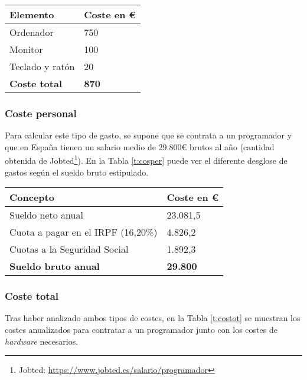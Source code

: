 \begin{center}
\begin{tabular}{|l|l|}
\hline
\textbf{Elemento}    & \textbf{Coste en €} \\ \hline
Ordenador            & 750                 \\ \hline
Monitor              & 100                 \\ \hline
Teclado y ratón      & 20                  \\ \hline
\textbf{Coste total} & \textbf{870}        \\ \hline
\end{tabular}
\label{t:coshar}
\end{center}

\subsubsection{Coste personal}
Para calcular este tipo de gasto, se supone que se contrata a un programador y que en España tienen un salario medio de 29.800€ brutos al año (cantidad obtenida de Jobted\footnote{ Jobted: \url{https://www.jobted.es/salario/programador}}). En la Tabla \ref{t:cosper} puede ver el diferente desglose de gastos según el sueldo bruto estipulado.

\begin{center}
\begin{tabular}{|l|l|}
\hline
\textbf{Concepto}                  & \textbf{Coste en €} \\ \hline
Sueldo neto anual                  & 23.081,5            \\ \hline
Cuota a pagar en el IRPF (16,20\%) & 4.826,2             \\ \hline
Cuotas a la Seguridad Social       & 1.892,3             \\ \hline
\textbf{Sueldo bruto anual}        & \textbf{29.800}     \\ \hline
\end{tabular}
\label{t:cosper}
\end{center}

\subsubsection{Coste total}
Tras haber analizado ambos tipos de costes, en la Tabla \ref{t:costot} se muestran los costes anualizados para contratar a un programador junto con los costes de \emph{hardware} necesarios.

